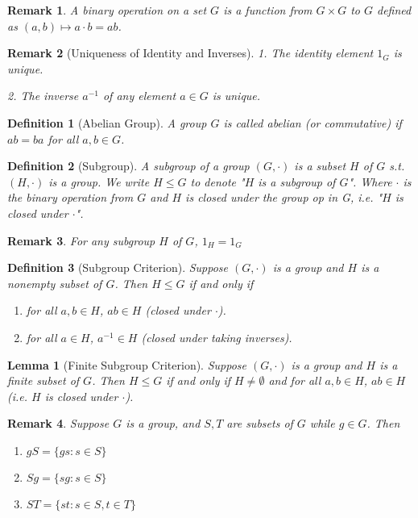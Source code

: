 \documentclass[12pt]{article}
\newtheorem{definition}{Definition}[section]
\newtheorem{lemma}{Lemma}[section]
\newtheorem{remark}{Remark}[section]
\begin{document}
\begin{remark} 
    A binary operation on a set $G$ is a function from $G \times G$ to $G$ defined as $(a,b) \mapsto a \cdot b = ab$.
\end{remark}

\begin{remark}[Uniqueness of Identity and Inverses]
        \item 1. The identity element $1_G$ is unique.
        \item 2. The inverse $a^{-1}$ of any element $a \in G$ is unique.
\end{remark}

\begin{definition}[Abelian Group]
A group $G$ is called \emph{abelian} (or commutative) if $ab = ba$ for all $a,b \in G$.
\end{definition}

\begin{definition}[Subgroup]
A subgroup of a group $(G, \cdot)$ is a subset $H$ of $G$ s.t. $(H, \cdot)$ is a group. We write $H\leq G$ to denote "$H$ is a subgroup of $G$". Where $\cdot$ is the binary operation from $G$ and $H$ is closed under the group op in G, i.e. "$H$ is closed under $\cdot$".
\end{definition}

\begin{remark}
    For any subgroup $H$ of $G$, $1_H = 1_G$ 
\end{remark}

\begin{definition}[Subgroup Criterion]
    Suppose $(G, \cdot)$ is a group and $H$ is a nonempty subset of $G$. Then $H \leq G$ if and only if 
    \begin{enumerate}
        \item for all $a,b \in H$, $ab \in H$ (closed under $\cdot$).
        \item for all $a \in H$, $a^{-1} \in H$ (closed under taking inverses).
    \end{enumerate}
\end{definition}

\begin{lemma}[Finite Subgroup Criterion]
Suppose $(G, \cdot) $ is a group and $H$ is a finite subset of $G$. Then $H \leq G$ if and only if $H \neq \emptyset$ and for all $a,b \in H$, $ab \in H$ (i.e. $H$ is closed under $\cdot$).
\end{lemma}

\begin{remark}
    Suppose $G$ is a group, and $S, T$ are subsets of $G$ while $g \in G$. Then
    \begin{enumerate}
        \item $gS = \{ gs : s \in S \}$
        \item $Sg = \{ sg : s \in S \}$
        \item $ST = \{ st : s \in S, t \in T \}$
    \end{enumerate}
\end{remark}
\end{document}
